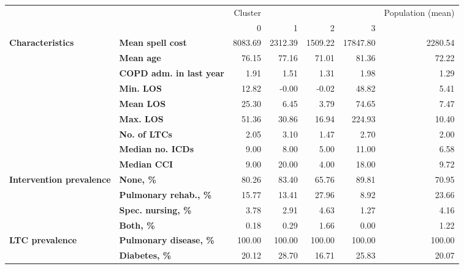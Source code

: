 \begin{tabular}{llrrrrr}
\toprule
               &        &  Cluster &          &          &           & Population (mean) \\
               &        &        0 &        1 &        2 &         3 &                   \\
\midrule
\textbf{Characteristics} & \textbf{Mean spell cost} &  8083.69 &  2312.39 &  1509.22 &  17847.80 &           2280.54 \\
               & \textbf{Mean age} &    76.15 &    77.16 &    71.01 &     81.36 &             72.22 \\
               & \textbf{COPD adm. in last year} &     1.91 &     1.51 &     1.31 &      1.98 &              1.29 \\
               & \textbf{Min. LOS} &    12.82 &    -0.00 &    -0.02 &     48.82 &              5.41 \\
               & \textbf{Mean LOS} &    25.30 &     6.45 &     3.79 &     74.65 &              7.47 \\
               & \textbf{Max. LOS} &    51.36 &    30.86 &    16.94 &    224.93 &             10.40 \\
               & \textbf{No. of LTCs} &     2.05 &     3.10 &     1.47 &      2.70 &              2.00 \\
               & \textbf{Median no. ICDs} &     9.00 &     8.00 &     5.00 &     11.00 &              6.58 \\
               & \textbf{Median CCI} &     9.00 &    20.00 &     4.00 &     18.00 &              9.72 \\
\textbf{Intervention prevalence} & \textbf{None, \%} &    80.26 &    83.40 &    65.76 &     89.81 &             70.95 \\
               & \textbf{Pulmonary rehab., \%} &    15.77 &    13.41 &    27.96 &      8.92 &             23.66 \\
               & \textbf{Spec. nursing, \%} &     3.78 &     2.91 &     4.63 &      1.27 &              4.16 \\
               & \textbf{Both, \%} &     0.18 &     0.29 &     1.66 &      0.00 &              1.22 \\
\textbf{LTC prevalence} & \textbf{Pulmonary disease, \%} &   100.00 &   100.00 &   100.00 &    100.00 &            100.00 \\
               & \textbf{Diabetes, \%} &    20.12 &    28.70 &    16.71 &     25.83 &             20.07 \\

\end{tabular}

